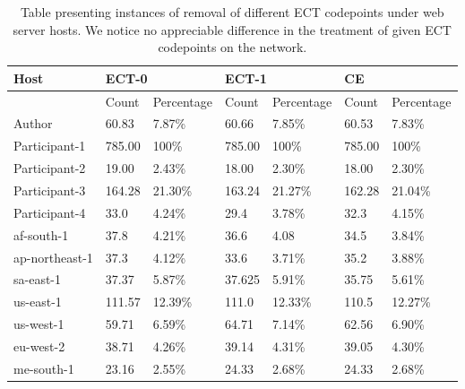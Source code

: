 \documentclass{l4proj}
\begin{document}
\begin{table}[H]
\begin{tabular}{|l|l|l|l|l|l|l|}
\hline
Host           & \multicolumn{2}{l|}{ECT-0} & \multicolumn{2}{l|}{ECT-1} & \multicolumn{2}{l|}{CE} \\ \hline
               & Count      & Percentage    & Count      & Percentage    & Count    & Percentage   \\ \hline
Author         & 60.83      & 7.87\%        & 60.66      & 7.85\%        & 60.53    & 7.83\%       \\ \hline
Participant-1  & 785.00     & 100\%         & 785.00     & 100\%         & 785.00   & 100\%        \\ \hline
Participant-2  & 19.00      & 2.43\%        & 18.00      & 2.30\%        & 18.00    & 2.30\%       \\ \hline
Participant-3  & 164.28     & 21.30\%        & 163.24     & 21.27\%  & 162.28   &   21.04\%          \\ \hline
Participant-4  & 33.0       & 4.24\%    & 29.4       &  3.78\%     & 32.3     &    4.15\%          \\ \hline
af-south-1     & 37.8       & 4.21\%              & 36.6       &  4.08             & 34.5     & 3.84\%             \\ \hline
ap-northeast-1 & 37.3       & 4.12\%              & 33.6       &   3.71\%            & 35.2     &  3.88\%            \\ \hline
sa-east-1      & 37.37      &  5.87\%             & 37.625     &  5.91\%             & 35.75    & 5.61\%             \\ \hline
us-east-1      & 111.57     & 12.39\%              & 111.0      &  12.33\%             & 110.5    &  12.27\%            \\ \hline
us-west-1      & 59.71      &  6.59\%             & 64.71      &    7.14\%           & 62.56    & 6.90\%             \\ \hline
eu-west-2      & 38.71      &  4.26\%             & 39.14      &   4.31\%            & 39.05    &   4.30\%           \\ \hline
me-south-1     & 23.16      &  2.55\%             & 24.33      &    2.68\%           & 24.33    & 2.68\%              \\ \hline
\end{tabular}
\caption{Table presenting instances of removal of different ECT codepoints under web server hosts. We notice no appreciable difference in the treatment of given ECT codepoints on the network.}
\label{tab:diffect}
\end{table}
\end{document}
